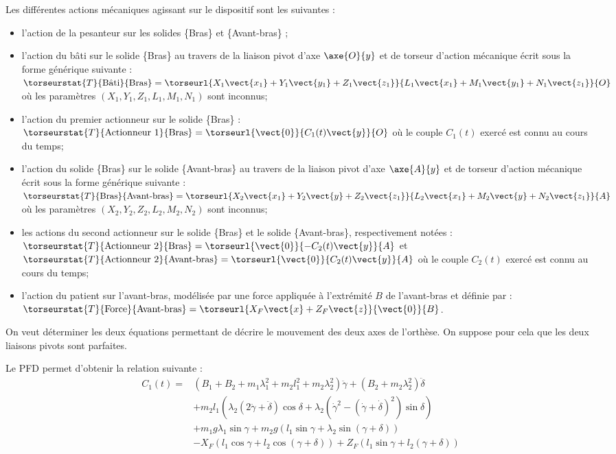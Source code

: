 Les différentes actions mécaniques agissant sur le dispositif sont les suivantes :
\begin{itemize}
\item l’action de la pesanteur sur les solides \{Bras\} et \{Avant-bras\} ;
\item l’action du bâti sur le solide \{Bras\} au travers de la liaison pivot d’axe $\axe{O}{y}$ et de torseur d’action mécanique écrit sous la forme générique suivante : 
$\torseurstat{T}{\text{Bâti}}{\text{Bras}}=\torseurl{X_1\vect{x_1}+Y_1\vect{y_1}+Z_1\vect{z_1}}{L_1\vect{x_1}+M_1\vect{y_1}+N_1\vect{z_1}}{O}$ où les paramètres $\left(X_1, Y_1, Z_1, L_1, M_1, N_1\right)$ sont inconnus;
\item l’action du premier actionneur sur le solide \{Bras\} :
$\torseurstat{T}{\text{Actionneur 1}}{\text{Bras}}=\torseurl{\vect{0}}{C_1(t) \vect{y}}{O}$ où le couple $C_1(t)$ exercé est connu au cours du temps;
\item  l’action du solide \{Bras\} sur le solide \{Avant-bras\} au travers de la liaison pivot d’axe $\axe{A}{y}$ et de torseur d’action mécanique écrit sous la forme générique suivante : 
$\torseurstat{T}{\text{Bras}}{\text{Avant-bras}}=\torseurl{X_2\vect{x_1}+Y_2\vect{y}+Z_2\vect{z_1}}{L_2\vect{x_1}+M_2\vect{y}+N_2\vect{z_1}}{A}$ où les paramètres $\left(X_2, Y_2, Z_2, L_2, M_2, N_2\right)$ sont inconnus;
\item les actions du second actionneur sur le solide \{Bras\} et le solide \{Avant-bras\}, respectivement notées :
$\torseurstat{T}{\text{Actionneur 2}}{\text{Bras}}=\torseurl{\vect{0}}{-C_2(t) \vect{y}}{A}$ et 
$\torseurstat{T}{\text{Actionneur 2}}{\text{Avant-bras}}=\torseurl{\vect{0}}{C_2(t) \vect{y}}{A}$ où le couple $C_2(t)$ exercé est connu au cours du temps;
\item l’action du patient sur l’avant-bras, modélisée par une force appliquée à l’extrémité $B$ de l’avant-bras et
définie par : 
$\torseurstat{T}{\text{Force}}{\text{Avant-bras}}=\torseurl{X_F\vect{x}+Z_F\vect{z}}{\vect{0}}{B}$. 
\end{itemize}

On veut déterminer les deux équations permettant de décrire le mouvement des deux axes de l’orthèse. On
suppose pour cela que les deux liaisons pivots sont parfaites.

Le PFD permet d'obtenir la relation suivante : 
$$
\begin{array}{ll}
C_1(t)=&
\left(B_1+B_2 +m_1 \lambda_1^2 + m_2 l_1^2 + m_2 \lambda_2^2 \right)\ddot{\gamma} +\left( B_2 + m_2\lambda_2^2\right) \ddot{\delta}\\
& +m_2 l_1 \left( \lambda_2 \left(2\ddot{\gamma}+\ddot{\delta} \right)\cos \delta + \lambda_2 \left( \dot{\gamma}^2-\left( \dot{\gamma} + \dot{\delta}\right)^2\right) \sin\delta\right) \\
& + m_1g\lambda_1\sin\gamma + m_2 g \left(l_1 \sin \gamma+\lambda_2 \sin \left(\gamma+ \delta\right) \right)\\
& -X_F \left( l_1 \cos \gamma +l_2 \cos \left( \gamma+\delta\right) \right) + Z_F \left( l_1 \sin \gamma + l_2 \left( \gamma + \delta \right)\right)
\end{array}
$$

